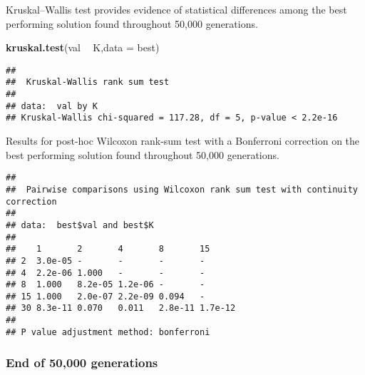 \documentclass[]{book}
\newenvironment{Shaded}{\begin{snugshade}}{\end{snugshade}}
\newcommand{\DataTypeTok}[1]{\textcolor[rgb]{0.13,0.29,0.53}{#1}}
\newcommand{\KeywordTok}[1]{\textcolor[rgb]{0.13,0.29,0.53}{\textbf{#1}}}
\newcommand{\NormalTok}[1]{#1}
\newcommand{\OperatorTok}[1]{\textcolor[rgb]{0.81,0.36,0.00}{\textbf{#1}}}
\newcommand{\OtherTok}[1]{\textcolor[rgb]{0.56,0.35,0.01}{#1}}
\newcommand{\StringTok}[1]{\textcolor[rgb]{0.31,0.60,0.02}{#1}}
\begin{document}
Kruskal--Wallis test provides evidence of statistical differences among the best performing solution found throughout 50,000 generations.

\begin{Shaded}
\begin{Highlighting}[]
\KeywordTok{kruskal.test}\NormalTok{(val }\OperatorTok{~}\StringTok{ }\NormalTok{K,}\DataTypeTok{data =}\NormalTok{ best)}
\end{Highlighting}
\end{Shaded}

\begin{verbatim}
## 
##  Kruskal-Wallis rank sum test
## 
## data:  val by K
## Kruskal-Wallis chi-squared = 117.28, df = 5, p-value < 2.2e-16
\end{verbatim}

Results for post-hoc Wilcoxon rank-sum test with a Bonferroni correction on the best performing solution found throughout 50,000 generations.

\begin{Shaded}
\end{Shaded}

\begin{verbatim}
## 
##  Pairwise comparisons using Wilcoxon rank sum test with continuity correction 
## 
## data:  best$val and best$K 
## 
##    1       2       4       8       15     
## 2  3.0e-05 -       -       -       -      
## 4  2.2e-06 1.000   -       -       -      
## 8  1.000   8.2e-05 1.2e-06 -       -      
## 15 1.000   2.0e-07 2.2e-09 0.094   -      
## 30 8.3e-11 0.070   0.011   2.8e-11 1.7e-12
## 
## P value adjustment method: bonferroni
\end{verbatim}

\hypertarget{end-of-50000-generations-28}{%
\subsubsection{End of 50,000 generations}\label{end-of-50000-generations-28}}
\end{document}

